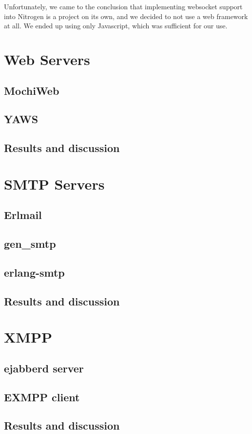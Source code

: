 \documentclass[11pt,a4paper]{report}
\begin{document}
Unfortunately, we came to the conclusion that implementing websocket support
into Nitrogen is a project on its own, and we decided to not use a web
framework at all. We ended up using only Javascript, which was sufficient for
our use.

\section{Web Servers}
\subsection{MochiWeb}
\subsection{YAWS}
\subsection{Results and discussion}

\section{SMTP Servers}
\subsection{Erlmail}
\subsection{gen\_smtp}
\subsection{erlang-smtp}
\subsection{Results and discussion}

\section{XMPP}
\subsection{ejabberd server}
\subsection{EXMPP client}
\subsection{Results and discussion}
\end{document}
